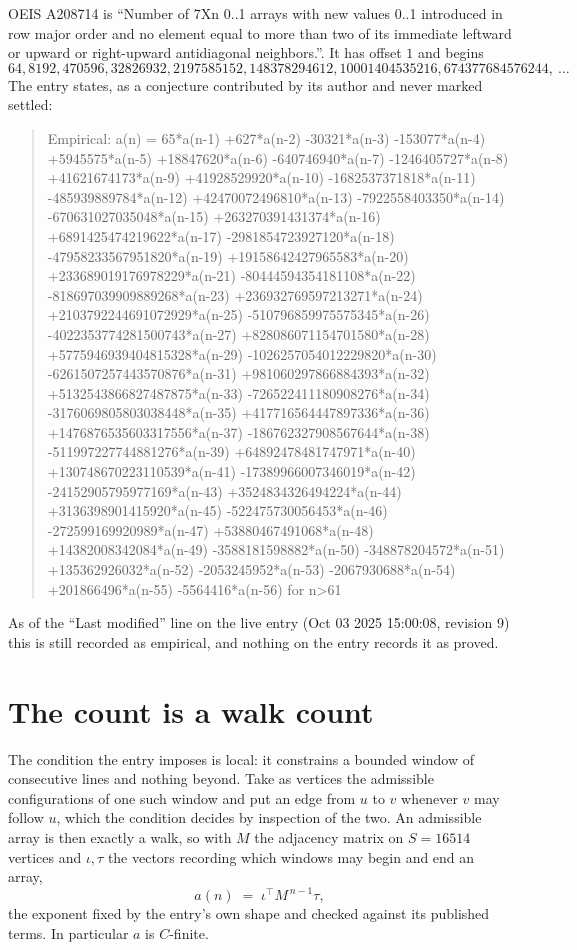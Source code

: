 \documentclass[11pt,a4paper]{article}
\theoremstyle{plain}
\theoremstyle{definition}
\begin{document}
OEIS A208714 is ``Number of 7Xn 0..1 arrays with new values 0..1 introduced in row major order and no element equal to more than two of its immediate leftward or upward or right-upward antidiagonal neighbors.''. It has offset $1$ and begins
\[
64, 8192, 470596, 32826932, 2197585152, 148378294612, 10001404535216, 674377684576244,\ \dots
\]
The entry states, as a conjecture contributed by its author and never marked settled:
\begin{quote}
Empirical: a(n) = 65*a(n-1) +627*a(n-2) -30321*a(n-3) -153077*a(n-4) +5945575*a(n-5) +18847620*a(n-6) -640746940*a(n-7) -1246405727*a(n-8) +41621674173*a(n-9) +41928529920*a(n-10) -1682537371818*a(n-11) -485939889784*a(n-12) +42470072496810*a(n-13) -7922558403350*a(n-14) -670631027035048*a(n-15) +263270391431374*a(n-16) +6891425474219622*a(n-17) -2981854723927120*a(n-18) -47958233567951820*a(n-19) +19158642427965583*a(n-20) +233689019176978229*a(n-21) -80444594354181108*a(n-22) -818697039909889268*a(n-23) +236932769597213271*a(n-24) +2103792244691072929*a(n-25) -510796859975575345*a(n-26) -4022353774281500743*a(n-27) +828086071154701580*a(n-28) +5775946939404815328*a(n-29) -1026257054012229820*a(n-30) -6261507257443570876*a(n-31) +981060297866884393*a(n-32) +5132543866827487875*a(n-33) -726522411180908276*a(n-34) -3176069805803038448*a(n-35) +417716564447897336*a(n-36) +1476876535603317556*a(n-37) -186762327908567644*a(n-38) -511997227744881276*a(n-39) +64892478481747971*a(n-40) +130748670223110539*a(n-41) -17389966007346019*a(n-42) -24152905795977169*a(n-43) +3524834326494224*a(n-44) +3136398901415920*a(n-45) -522475730056453*a(n-46) -272599169920989*a(n-47) +53880467491068*a(n-48) +14382008342084*a(n-49) -3588181598882*a(n-50) -348878204572*a(n-51) +135362926032*a(n-52) -2053245952*a(n-53) -2067930688*a(n-54) +201866496*a(n-55) -5564416*a(n-56) for n>61
\end{quote}
As of the ``Last modified'' line on the live entry (Oct 03 2025 15:00:08, revision 9) this is still
recorded as empirical, and nothing on the entry records it as proved.

\section{The count is a walk count}

The condition the entry imposes is local: it constrains a bounded window of consecutive lines and nothing beyond. Take as
vertices the admissible configurations of one such window and put an edge from $u$ to $v$
whenever $v$ may follow $u$, which the condition decides by inspection of the two. An
admissible array is then exactly a walk, so with $M$ the adjacency matrix on $S=16514$ vertices
and $\iota,\tau$ the vectors recording which windows may begin and end an array,
\[
a(n)\;=\;\iota^{\!\top}M^{\,n-1}\tau ,
\]
the exponent fixed by the entry's own shape and checked against its published terms. In
particular $a$ is $C$-finite.
\end{document}
